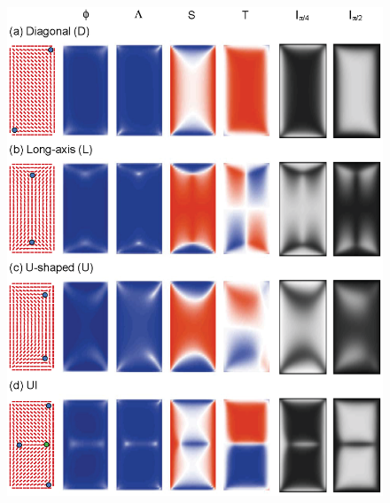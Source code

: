 \documentclass[prl,twocolumn,preprintnumbers,reprint]{revtex4}
\begin{document}
\begin{figure}[!t]\begin{center}
\includegraphics[width = 1\columnwidth]{eps/s_t_phi2Ch.eps}

\end{center}
\end{figure}
\end{document}
